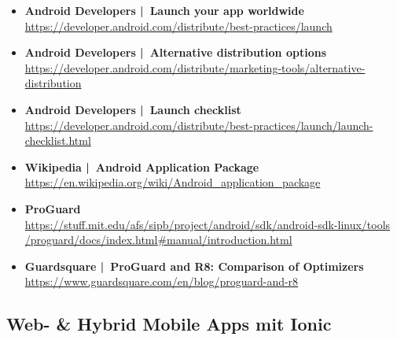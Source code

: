 \documentclass[a4paper]{article}
\begin{document}
{\begin{itemize}
		\item \textbf{Android Developers | Launch your app worldwide}\\
		\href{https://developer.android.com/distribute/best-practices/launch}
		{https://developer.android.com/distribute/best-practices/launch}
		
		\item \textbf{Android Developers | Alternative distribution options}\\
		\href{https://developer.android.com/distribute/marketing-tools/alternative-distribution}
		{https://developer.android.com/distribute/marketing-tools/alternative-distribution}
		
		\item \textbf{Android Developers | Launch checklist}\\
		\href{https://developer.android.com/distribute/best-practices/launch/launch-checklist.html}
		{https://developer.android.com/distribute/best-practices/launch/launch-checklist.html}
		
		\item \textbf{Wikipedia | Android Application Package}\\
		\href{https://en.wikipedia.org/wiki/Android_application_package}
		{https://en.wikipedia.org/wiki/Android\_application\_package}
		
		\item \textbf{ProGuard}\\
		\href{https://stuff.mit.edu/afs/sipb/project/android/sdk/android-sdk-linux/tools/proguard/docs/index.html#manual/introduction.html}
		{https://stuff.mit.edu/afs/sipb/project/android/sdk/android-sdk-linux/tools\\ \quad /proguard/docs/index.html\#manual/introduction.html}
		
		\item \textbf{Guardsquare | ProGuard and R8: Comparison of Optimizers}\\
		\href{https://www.guardsquare.com/en/blog/proguard-and-r8}
		{https://www.guardsquare.com/en/blog/proguard-and-r8}
		
	\end{itemize}

	\newpage

	\subsection{Web- \& Hybrid Mobile Apps mit Ionic}
	
	\begin{itemize}
		

\end{itemize}}
\end{document}
